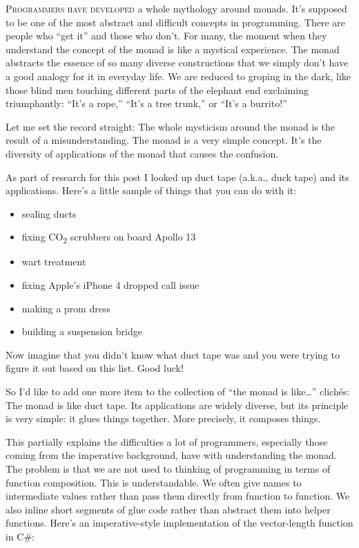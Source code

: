 
\lettrine[lhang=0.17]{P}{rogrammers have developed} a whole mythology around monads. It's
supposed to be one of the most abstract and difficult concepts in
programming. There are people who ``get it'' and those who don't. For
many, the moment when they understand the concept of the monad is like a
mystical experience. The monad abstracts the essence of so many diverse
constructions that we simply don't have a good analogy for it in
everyday life. We are reduced to groping in the dark, like those blind
men touching different parts of the elephant end exclaiming
triumphantly: ``It's a rope,'' ``It's a tree trunk,'' or ``It's a
burrito!''

Let me set the record straight: The whole mysticism around the monad is
the result of a misunderstanding. The monad is a very simple concept.
It's the diversity of applications of the monad that causes the
confusion.

As part of research for this post I looked up duct tape (a.k.a., duck
tape) and its applications. Here's a little sample of things that you
can do with it:

\begin{itemize}
  \tightlist
  \item
        sealing ducts
  \item
        fixing CO\textsubscript{2} scrubbers on board Apollo 13
  \item
        wart treatment
  \item
        fixing Apple's iPhone 4 dropped call issue
  \item
        making a prom dress
  \item
        building a suspension bridge
\end{itemize}

\noindent
Now imagine that you didn't know what duct tape was and you were trying
to figure it out based on this list. Good luck!

So I'd like to add one more item to the collection of ``the monad is
like\ldots{}'' clichés: The monad is like duct tape. Its applications
are widely diverse, but its principle is very simple: it glues things
together. More precisely, it composes things.

This partially explains the difficulties a lot of programmers,
especially those coming from the imperative background, have with
understanding the monad. The problem is that we are not used to thinking
of programming in terms of function composition. This is understandable.
We often give names to intermediate values rather than pass them
directly from function to function. We also inline short segments of
glue code rather than abstract them into helper functions. Here's an
imperative-style implementation of the vector-length function in C\#:

